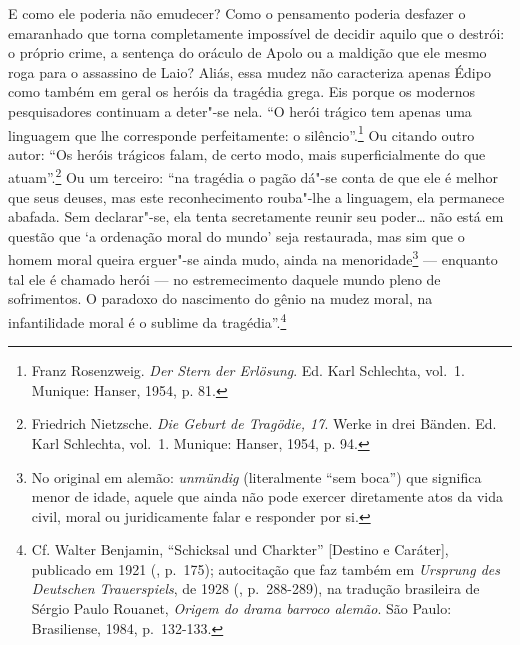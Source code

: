 E como ele poderia não emudecer? Como o pensamento poderia desfazer o
emaranhado que torna completamente impossível de decidir aquilo que o destrói: o
próprio crime, a sentença do oráculo de Apolo ou a maldição que ele
mesmo roga para o assassino de Laio? Aliás, essa mudez não caracteriza
apenas Édipo como também em geral os heróis da tragédia grega. Eis
porque os modernos pesquisadores continuam a deter"-se nela. ``O herói
trágico tem apenas uma linguagem que lhe corresponde perfeitamente: o
silêncio''.\footnote{Franz Rosenzweig. \emph{Der Stern der
  Erlösung}. Ed. Karl Schlechta, vol.~1. Munique: Hanser, 1954, p. 81. \versal{[N.~E.]}}
Ou citando outro autor: ``Os heróis trágicos falam, de certo modo, mais
superficialmente do que atuam''.\footnote{Friedrich Nietzsche.
  \emph{Die Geburt de Tragödie, 17}. Werke in drei Bänden. Ed.
  Karl Schlechta, vol.~1. Munique: Hanser, 1954, p. 94. \versal{[N.~E.]}} Ou um terceiro: ``na
tragédia o pagão dá"-se conta de que ele é melhor que seus deuses, mas
este reconhecimento rouba"-lhe a linguagem, ela permanece abafada. Sem
declarar"-se, ela tenta secretamente reunir seu poder\ldots{} não está em
questão que `a ordenação moral do mundo' seja restaurada, mas sim que o
homem moral queira erguer"-se ainda mudo, ainda na menoridade\footnote{No original em alemão: \emph{unmündig} (literalmente ``sem boca'') que significa
  menor de idade, aquele que ainda não pode exercer diretamente atos da
  vida civil, moral ou juridicamente falar e responder por si. \versal{[N. T.]}} ---
enquanto tal ele é chamado herói --- no estremecimento daquele mundo
pleno de sofrimentos. O paradoxo do nascimento do gênio na mudez moral,
na infantilidade moral é o sublime da tragédia''.\footnote{Cf.
  Walter Benjamin, ``Schicksal und Charkter'' {[}Destino e Caráter{]},
  publicado em 1921 (, p.~175); autocitação que faz também em
  \emph{Ursprung des Deutschen Trauerspiels}, de 1928 (, p.~288-289),
  na tradução brasileira de Sérgio Paulo Rouanet, \emph{Origem do drama
  barroco alemão}. São Paulo: Brasiliense, 1984, p.~132-133. \versal{[N.~T.]}}

